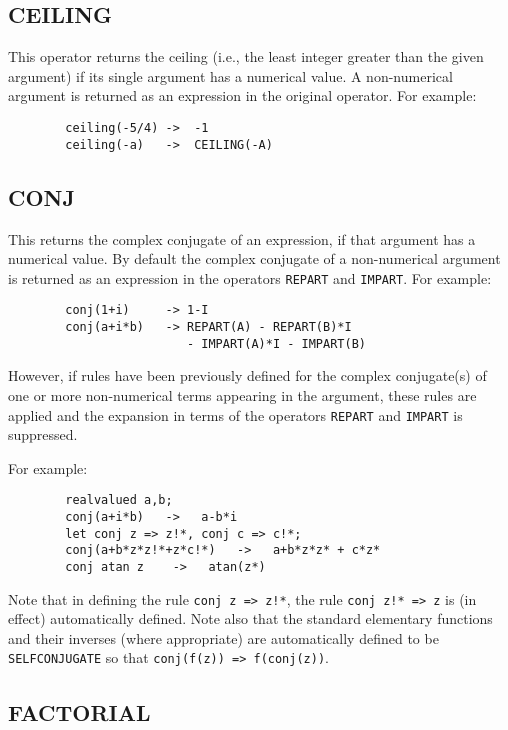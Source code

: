 \subsection{CEILING}
\hypertarget{operator:CEILING}{}
This operator returns the ceiling (i.e., the least integer greater than
the given argument) if its single argument has a numerical value.  A
non-numerical argument is returned as an expression in the original
operator.  For example:

\begin{verbatim}
        ceiling(-5/4) ->  -1
        ceiling(-a)   ->  CEILING(-A)
\end{verbatim}

\subsection{CONJ}
\hypertarget{operator:CONJ}{}
This returns the complex conjugate
of an expression, if that argument has a numerical value.  By default the
complex conjugate of a non-numerical argument is returned as an expression
in the operators
\texttt{REPART} and \texttt{IMPART}.
For example:
\begin{verbatim}
        conj(1+i)     -> 1-I
        conj(a+i*b)   -> REPART(A) - REPART(B)*I
                         - IMPART(A)*I - IMPART(B)
\end{verbatim}

However, if rules have been previously defined for the complex conjugate(s)
of one or more non-numerical terms appearing in the argument, these rules are
applied and the expansion in terms of the operators
\texttt{REPART} and \texttt{IMPART} is
suppressed.

For example:
\begin{verbatim}
        realvalued a,b;
        conj(a+i*b)   ->   a-b*i
        let conj z => z!*, conj c => c!*;
        conj(a+b*z*z!*+z*c!*)   ->   a+b*z*z* + c*z*
        conj atan z    ->   atan(z*)  
\end{verbatim}

Note that in defining the rule \texttt{conj z => z!*}, the rule
\texttt{conj z!*  => z} is (in effect) automatically defined.
Note also that the standard elementary functions and their inverses
(where appropriate) are automatically defined to be
  \texttt{SELFCONJUGATE} so that
 \texttt{conj(f(z)) => f(conj(z))}.

\subsection{FACTORIAL}
\hypertarget{operator:FACTORIAL}{}

